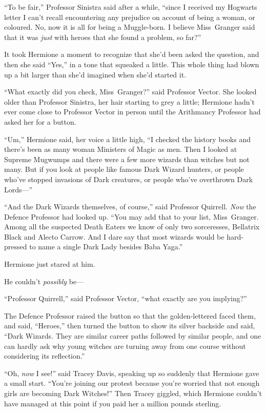 “To be fair,” Professor Sinistra said after a while, “since I received my Hogwarts letter I can’t recall encountering any prejudice on account of being a woman, or coloured. No, now it is all for being a Muggle-born. I believe Miss~Granger said that it was \emph{just} with heroes that she found a problem, so far?”

It took Hermione a moment to recognize that she’d been asked the question, and then she said “Yes,” in a tone that squeaked a little. This whole thing had blown up a bit larger than she’d imagined when she’d started it.

“What exactly did you check, Miss~Granger?” said Professor Vector. She looked older than Professor Sinistra, her hair starting to grey a little; Hermione hadn’t ever come close to Professor Vector in person until the Arithmancy Professor had asked her for a button.

“Um,” Hermione said, her voice a little high, “I checked the history books and there’s been as many woman Ministers of Magic as men. Then I looked at Supreme Mugwumps and there were a few more wizards than witches but not many. But if you look at people like famous Dark Wizard hunters, or people who’ve stopped invasions of Dark creatures, or people who’ve overthrown Dark Lords—”

“And the Dark Wizards themselves, of course,” said Professor Quirrell. \emph{Now} the Defence Professor had looked up. “You may add that to your list, Miss~Granger. Among all the suspected Death Eaters we know of only two sorceresses, Bellatrix Black and Alecto Carrow. And I dare say that most wizards would be hard-pressed to name a single Dark Lady besides Baba Yaga.”

Hermione just stared at him.

He couldn’t \emph{possibly} be—

“Professor Quirrell,” said Professor Vector, “what exactly are you implying?”

The Defence Professor raised the button so that the golden-lettered \SPHEW faced them, and said, “Heroes,” then turned the button to show its silver backside and said, “Dark Wizards. They are similar career paths followed by similar people, and one can hardly ask why young witches are turning away from one course without considering its reflection.”

“Oh, \emph{now} I see!” said Tracey Davis, speaking up so suddenly that Hermione gave a small start. “You’re joining our protest because you’re worried that not enough girls are becoming Dark Witches!” Then Tracey giggled, which Hermione couldn’t have managed at this point if you paid her a million pounds sterling.


